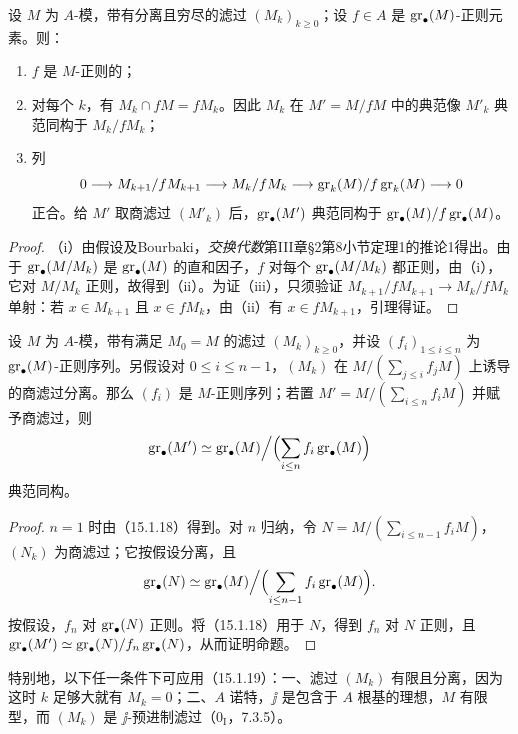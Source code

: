 设 $M$ 为 $A$-模，带有分离且穷尽的滤过 $(M_k)_{k\geq0}$；设 $f\in A$ 是 $\operatorname{gr}_\bullet(M)$-正则元素。则：
\begin{enumerate}[label=(\roman*)]
\item $f$ 是 $M$-正则的；
\item 对每个 $k$，有 $M_k\cap fM=fM_k$。因此 $M_k$ 在 $M'=M/fM$ 中的典范像 $M'_k$ 典范同构于 $M_k/fM_k$；
\item 列
\[
 0\longrightarrow M_{k+1}/fM_{k+1}\longrightarrow M_k/fM_k
 \longrightarrow\operatorname{gr}_k(M)/f\operatorname{gr}_k(M)\longrightarrow0
\]
正合。给 $M'$ 取商滤过 $(M'_k)$ 后，$\operatorname{gr}_\bullet(M')$ 典范同构于 $\operatorname{gr}_\bullet(M)/f\operatorname{gr}_\bullet(M)$。
\end{enumerate}
\begin{proof}
（i）由假设及Bourbaki，\textit{交换代数}第III章§2第8小节定理1的推论1得出。由于 $\operatorname{gr}_\bullet(M/M_k)$ 是 $\operatorname{gr}_\bullet(M)$ 的直和因子，$f$ 对每个 $\operatorname{gr}_\bullet(M/M_k)$ 都正则，由（i），它对 $M/M_k$ 正则，故得到（ii）。为证（iii），只须验证 $M_{k+1}/fM_{k+1}\to M_k/fM_k$ 单射：若 $x\in M_{k+1}$ 且 $x\in fM_k$，由（ii）有 $x\in fM_{k+1}$，引理得证。
\end{proof}

设 $M$ 为 $A$-模，带有满足 $M_0=M$ 的滤过 $(M_k)_{k\geq0}$，并设 $(f_i)_{1\leq i\leq n}$ 为 $\operatorname{gr}_\bullet(M)$-正则序列。另假设对 $0\leq i\leq n-1$，$(M_k)$ 在
$M/(\sum_{j\leq i}f_jM)$ 上诱导的商滤过分离。那么 $(f_i)$ 是 $M$-正则序列；若置 $M'=M/(\sum_{i\leq n}f_iM)$ 并赋予商滤过，则
\[
 \operatorname{gr}_\bullet(M')\simeq
 \operatorname{gr}_\bullet(M)\Big/\Bigl(\sum_{i\leq n}f_i\operatorname{gr}_\bullet(M)\Bigr)
\]
典范同构。
\begin{proof}
$n=1$ 时由（15.1.18）得到。对 $n$ 归纳，令
$N=M/(\sum_{i\leq n-1}f_iM)$，$(N_k)$ 为商滤过；它按假设分离，且
\[
 \operatorname{gr}_\bullet(N)\simeq
 \operatorname{gr}_\bullet(M)\Big/\Bigl(\sum_{i\leq n-1}f_i\operatorname{gr}_\bullet(M)\Bigr).
\]
按假设，$f_n$ 对 $\operatorname{gr}_\bullet(N)$ 正则。将（15.1.18）用于 $N$，得到 $f_n$ 对 $N$ 正则，且 $\operatorname{gr}_\bullet(M')\simeq\operatorname{gr}_\bullet(N)/f_n\operatorname{gr}_\bullet(N)$，从而证明命题。
\end{proof}
特别地，以下任一条件下可应用（15.1.19）：一、滤过 $(M_k)$ 有限且分离，因为这时 $k$ 足够大就有 $M_k=0$；二、$A$ 诺特，$\jj$ 是包含于 $A$ 根基的理想，$M$ 有限型，而 $(M_k)$ 是 $\jj$-预进制滤过（$0_{\mathrm I}$，7.3.5）。

